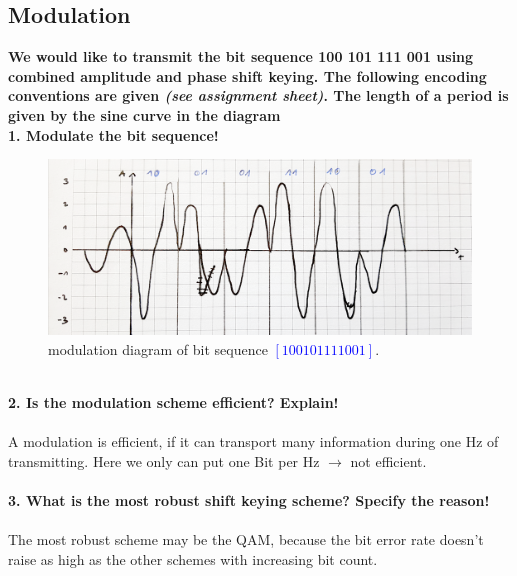 \documentclass[a4paper,12pt]{article}
\begin{document}
\subsection{Modulation}
\textbf{We would like to transmit the bit sequence 100 101 111 001 using combined amplitude and phase shift keying.  The following encoding conventions are given \textit{(see assignment sheet)}. The length of a period is given by the sine curve in the diagram\\
1.  Modulate the bit sequence!}
\begin{figure}[h!]
	\centering
	\includegraphics[width=0.9\linewidth]{modulation.png} 
	\caption{modulation diagram of bit sequence \textcolor{blue}{$[100101111001]$}.}
\end{figure}
\\
\textbf{2.  Is the modulation scheme efficient?  Explain!}\\
\\
A modulation is efficient, if it can transport many information during one Hz of transmitting. Here we only can put one Bit per Hz $\rightarrow$ not efficient.\\
\\
\textbf{3.  What is the most robust shift keying scheme?  Specify the reason!}\\
\\
The most robust scheme may be the QAM, because the bit error rate doesn't raise as high as the other schemes with increasing bit count.
\end{document}
